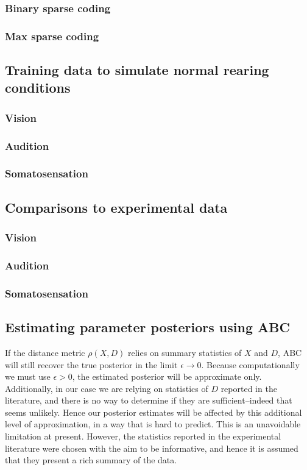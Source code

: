 \documentclass[10pt,letterpaper]{article}
\begin{document}
\subsubsection{Binary sparse coding}
\subsubsection{Max sparse coding}

\subsection{Training data to simulate normal rearing conditions}
\subsubsection{Vision}
\subsubsection{Audition}
\subsubsection{Somatosensation}

\subsection{Comparisons to experimental data}
\subsubsection{Vision}
\subsubsection{Audition}
\subsubsection{Somatosensation}

\subsection{Estimating parameter posteriors using ABC}

If the distance metric $\rho(X,D)$ relies on summary statistics of $X$ and $D$, ABC will still recover the true posterior in the limit $\epsilon \rightarrow 0$. Because computationally we must use $\epsilon > 0$, the estimated posterior will be approximate only. Additionally, in our case we are relying on statistics of $D$ reported in the literature, and there is no way to determine if they are sufficient--indeed that seems unlikely. Hence our posterior estimates will be affected by this additional level of approximation, in a way that is hard to predict. This is an unavoidable limitation at present. However, the statistics reported in the experimental literature were chosen with the aim to be informative, and hence it is assumed that they present a rich summary of the data.
\end{document}
